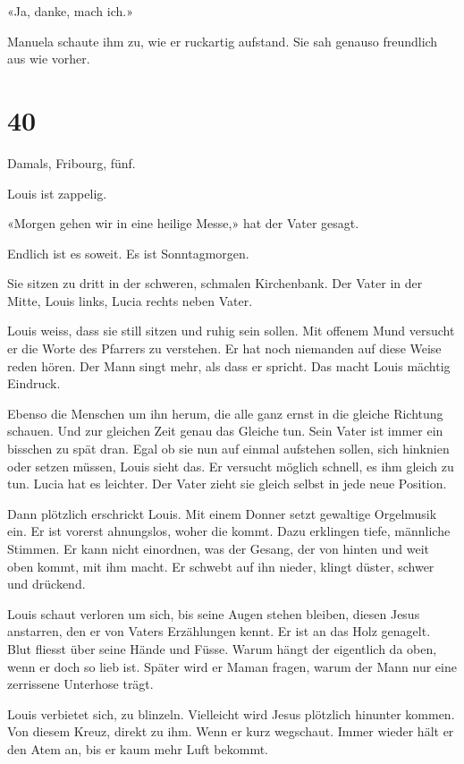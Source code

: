 «Ja, danke, mach ich.»

Manuela schaute ihm zu, wie er ruckartig aufstand. Sie sah genauso
freundlich aus wie vorher.

\chapter{40}\label{section-39}

Damals, Fribourg, fünf.

Louis ist zappelig.

«Morgen gehen wir in eine heilige Messe,» hat der Vater gesagt.

Endlich ist es soweit. Es ist Sonntagmorgen.

Sie sitzen zu dritt in der schweren, schmalen Kirchenbank. Der Vater in
der Mitte, Louis links, Lucia rechts neben Vater.

Louis weiss, dass sie still sitzen und ruhig sein sollen. Mit offenem
Mund versucht er die Worte des Pfarrers zu verstehen. Er hat noch
niemanden auf diese Weise reden hören. Der Mann singt mehr, als dass er
spricht. Das macht Louis mächtig Eindruck.

Ebenso die Menschen um ihn herum, die alle ganz ernst in die gleiche
Richtung schauen. Und zur gleichen Zeit genau das Gleiche tun. Sein
Vater ist immer ein bisschen zu spät dran. Egal ob sie nun auf einmal
aufstehen sollen, sich hinknien oder setzen müssen, Louis sieht das. Er
versucht möglich schnell, es ihm gleich zu tun. Lucia hat es leichter.
Der Vater zieht sie gleich selbst in jede neue Position.

Dann plötzlich erschrickt Louis. Mit einem Donner setzt gewaltige
Orgelmusik ein. Er ist vorerst ahnungslos, woher die kommt. Dazu
erklingen tiefe, männliche Stimmen. Er kann nicht einordnen, was der
Gesang, der von hinten und weit oben kommt, mit ihm macht. Er schwebt
auf ihn nieder, klingt düster, schwer und drückend.

Louis schaut verloren um sich, bis seine Augen stehen bleiben, diesen
Jesus anstarren, den er von Vaters Erzählungen kennt. Er ist an das Holz
genagelt. Blut fliesst über seine Hände und Füsse. Warum hängt der
eigentlich da oben, wenn er doch so lieb ist. Später wird er Maman
fragen, warum der Mann nur eine zerrissene Unterhose trägt.

Louis verbietet sich, zu blinzeln. Vielleicht wird Jesus plötzlich
hinunter kommen. Von diesem Kreuz, direkt zu ihm. Wenn er kurz
wegschaut. Immer wieder hält er den Atem an, bis er kaum mehr Luft
bekommt.


